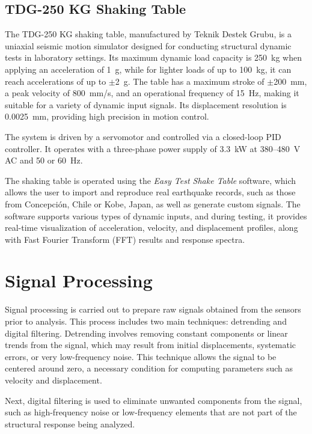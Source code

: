\documentclass{article}  %
\begin{document}
\subsection{TDG-250 KG Shaking Table}

The TDG-250 KG shaking table, manufactured by Teknik Destek Grubu, is a uniaxial seismic motion simulator designed for conducting structural dynamic tests in laboratory settings. Its maximum dynamic load capacity is 250~kg when applying an acceleration of 1~g, while for lighter loads of up to 100~kg, it can reach accelerations of up to $\pm$2~g. The table has a maximum stroke of $\pm$200~mm, a peak velocity of 800~mm/s, and an operational frequency of 15~Hz, making it suitable for a variety of dynamic input signals. Its displacement resolution is 0.0025~mm, providing high precision in motion control.

The system is driven by a servomotor and controlled via a closed-loop PID controller. It operates with a three-phase power supply of 3.3~kW at 380--480~V AC and 50 or 60~Hz.

The shaking table is operated using the \textit{Easy Test Shake Table} software, which allows the user to import and reproduce real earthquake records, such as those from Concepción, Chile or Kobe, Japan, as well as generate custom signals. The software supports various types of dynamic inputs, and during testing, it provides real-time visualization of acceleration, velocity, and displacement profiles, along with Fast Fourier Transform (FFT) results and response spectra.

\newpage
\section{Signal Processing}

Signal processing is carried out to prepare raw signals obtained from the sensors prior to analysis. This process includes two main techniques: detrending and digital filtering. Detrending involves removing constant components or linear trends from the signal, which may result from initial displacements, systematic errors, or very low-frequency noise. This technique allows the signal to be centered around zero, a necessary condition for computing parameters such as velocity and displacement.

Next, digital filtering is used to eliminate unwanted components from the signal, such as high-frequency noise or low-frequency elements that are not part of the structural response being analyzed.
\end{document}
